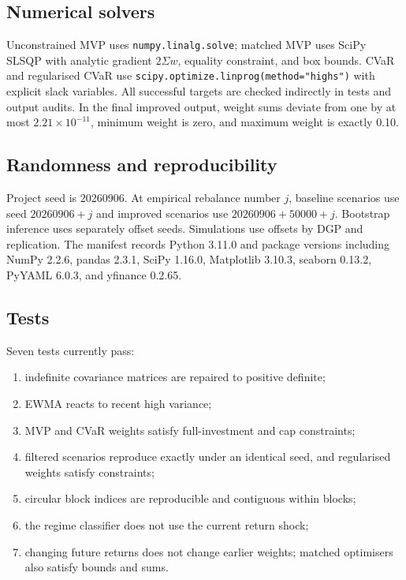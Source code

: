 \documentclass[11pt,a4paper]{article}
\newcommand{\code}[1]{\texttt{#1}}
\begin{document}
\subsection{Numerical solvers}

Unconstrained MVP uses \code{numpy.linalg.solve}; matched MVP uses SciPy SLSQP with analytic gradient $2\Sigma w$, equality constraint, and box bounds. CVaR and regularised CVaR use \code{scipy.optimize.linprog(method="highs")} with explicit slack variables. All successful targets are checked indirectly in tests and output audits. In the final improved output, weight sums deviate from one by at most $2.21\times10^{-11}$, minimum weight is zero, and maximum weight is exactly 0.10.

\subsection{Randomness and reproducibility}

Project seed is 20260906. At empirical rebalance number $j$, baseline scenarios use seed $20260906+j$ and improved scenarios use $20260906+50000+j$. Bootstrap inference uses separately offset seeds. Simulations use offsets by DGP and replication. The manifest records Python 3.11.0 and package versions including NumPy 2.2.6, pandas 2.3.1, SciPy 1.16.0, Matplotlib 3.10.3, seaborn 0.13.2, PyYAML 6.0.3, and yfinance 0.2.65.

\subsection{Tests}

Seven tests currently pass:
\begin{enumerate}
  \item indefinite covariance matrices are repaired to positive definite;
  \item EWMA reacts to recent high variance;
  \item MVP and CVaR weights satisfy full-investment and cap constraints;
  \item filtered scenarios reproduce exactly under an identical seed, and regularised weights satisfy constraints;
  \item circular block indices are reproducible and contiguous within blocks;
  \item the regime classifier does not use the current return shock;
  \item changing future returns does not change earlier weights; matched optimisers also satisfy bounds and sums.
\end{enumerate}
\end{document}
